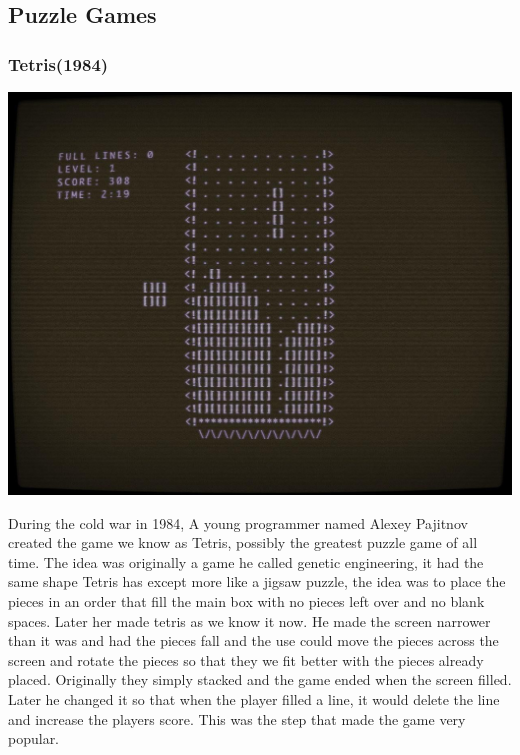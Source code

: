 \documentclass{article}
\begin{document}
\subsection{Puzzle Games}
\subsubsection{Tetris(1984)}
\begin{minipage}{0.43\textwidth}
\includegraphics[width=\linewidth]{tetris}
\end{minipage} \hfill
\begin{minipage}{0.55\textwidth}\raggedright
During the cold war in 1984, A young programmer named Alexey Pajitnov created the game we know as Tetris, possibly the greatest puzzle game of all time. The idea was originally a game he called genetic engineering, it had the same shape Tetris has except more like a jigsaw puzzle, the idea was to place the pieces in an order that fill the main box with no pieces left over and no blank spaces. Later her made tetris as we know it now. He made the screen narrower than it was and had the pieces fall and the use could move the pieces across the screen and rotate the pieces so that they we fit better with the pieces already placed. Originally they simply stacked and the game ended when the screen filled. Later he changed it so that when the player filled a line, it would delete the line and increase the players score. This was the step that made the game very popular. \newline
\end{minipage}
\end{document}
